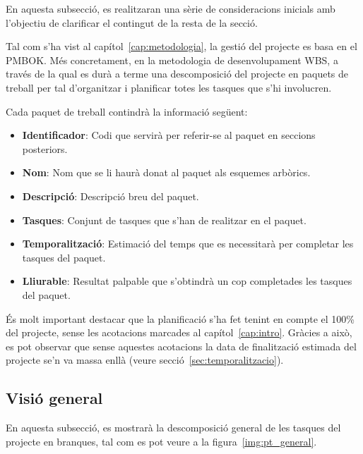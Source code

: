 \documentclass[a4paper,12pt]{ThesisStyle}
\begin{document}
En aquesta subsecció, es realitzaran una sèrie de consideracions inicials amb l'objectiu de clarificar el contingut de la resta de la secció.

Tal com s'ha vist al capítol~\ref{cap:metodologia}, la gestió del projecte es basa en el PMBOK. Més concretament, en la metodologia de desenvolupament WBS, a través de la qual es durà a terme una descomposició del projecte en paquets de treball per tal d'organitzar i planificar totes les tasques que s'hi involucren.

Cada paquet de treball contindrà la informació següent:
\begin{itemize}
  \item \textbf{Identificador}: Codi que servirà per referir-se al paquet en seccions posteriors.
  \item \textbf{Nom}: Nom que se li haurà donat al paquet als esquemes arbòrics.
  \item \textbf{Descripció}: Descripció breu del paquet.
  \item \textbf{Tasques}: Conjunt de tasques que s'han de realitzar en el paquet.
  \item \textbf{Temporalització}: Estimació del temps que es necessitarà per completar les tasques del paquet.
  \item \textbf{Lliurable}: Resultat palpable que s'obtindrà un cop completades les tasques del paquet.
\end{itemize}

És molt important destacar que la planificació s'ha fet tenint en compte el 100\% del projecte, sense les acotacions marcades al capítol~\ref{cap:intro}. Gràcies a això, es pot observar que sense aquestes acotacions la data de finalització estimada del projecte se'n va massa enllà (veure secció~\ref{sec:temporalitzacio}).

\newpage

\subsection{Visió general}
\label{subsec:visio_general}

En aquesta subsecció, es mostrarà la descomposició general de les tasques del projecte en branques, tal com es pot veure a la figura~\ref{img:pt_general}.
\end{document}
